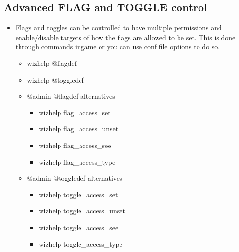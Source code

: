\documentclass[letterpaper,10pt,english]{sphinxmanual}
\begin{document}
\subsection{Advanced FLAG and TOGGLE control}
\label{\detokenize{features:advanced-flag-and-toggle-control}}\begin{itemize}
\item {} 
\sphinxAtStartPar
Flags and toggles can be controlled to have multiple permissions
and enable/disable targets of how the flags are allowed to be
set.  This is done through commands in\sphinxhyphen{}game or you can use
conf file options to do so.
\begin{itemize}
\item {} 
\sphinxAtStartPar
wizhelp @flagdef

\item {} 
\sphinxAtStartPar
wizhelp @toggledef

\item {} 
\sphinxAtStartPar
@admin @flagdef alternatives
\begin{itemize}
\item {} 
\sphinxAtStartPar
wizhelp flag\_access\_set

\item {} 
\sphinxAtStartPar
wizhelp flag\_access\_unset

\item {} 
\sphinxAtStartPar
wizhelp flag\_access\_see

\item {} 
\sphinxAtStartPar
wizhelp flag\_access\_type

\end{itemize}

\item {} 
\sphinxAtStartPar
@admin @toggledef alternatives
\begin{itemize}
\item {} 
\sphinxAtStartPar
wizhelp toggle\_access\_set

\item {} 
\sphinxAtStartPar
wizhelp toggle\_access\_unset

\item {} 
\sphinxAtStartPar
wizhelp toggle\_access\_see

\item {} 
\sphinxAtStartPar
wizhelp toggle\_access\_type

\end{itemize}

\end{itemize}

\end{itemize}
\end{document}

